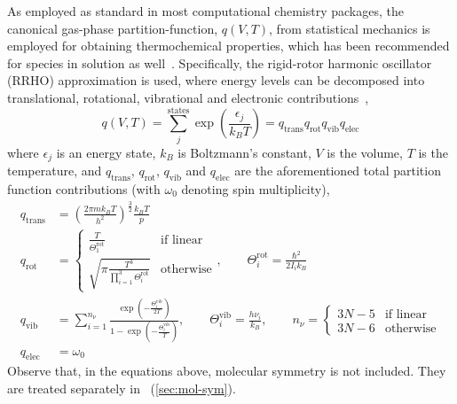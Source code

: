 As employed as standard in most computational chemistry packages,
the canonical gas-phase partition-function,
$q(V,
	T)$,
from statistical mechanics is employed for obtaining thermochemical properties,
which has been recommended for species in solution as well~\cite{Ribeiro_2011}.
Specifically,
the rigid-rotor harmonic oscillator (RRHO) approximation is used,
where energy levels can be decomposed into translational,
rotational,
vibrational and electronic contributions~\cite{McQuarrie_1997},
% 
\begin{equation}
	q(V,
	T) = \sum_j^\text{states} \exp \left( \frac{\epsilon_j}{k_B T} \right)
	= q_\text{trans}
	q_\text{rot}
	q_\text{vib}
	q_\text{elec}
\end{equation}
% 
where $\epsilon_j$ is an energy state,
$k_B$ is Boltzmann's constant,
$V$ is the volume,
$T$ is the temperature,
and $q_\text{trans}$,
$q_\text{rot}$,
$q_\text{vib}$ and $q_\text{elec}$ are the aforementioned total partition function contributions (with $\omega_0$ denoting spin multiplicity),
% 
\begin{equation}
	\begin{split}
		q_\text{trans}
		&= \left(
		\frac{2 \pi m k_B T}{h^2}
		\right)^\frac{3}{2}
		\frac{k_B T}{p} \\
		q_\text{rot}
		&= \begin{cases}
			\frac{T}{\Theta^\text{rot}_1}
			 & \text{if linear} \\
			\sqrt{
				\pi
				\frac{T^3}{
					\prod_{i = 1}^{3} \Theta^\text{rot}_i
				}
			}
			 & \text{otherwise}
		\end{cases},
		\qquad
		\Theta^\text{rot}_i = \frac{\hbar^2}{2 I_i k_B} \\
		q_\text{vib}
		&= \sum_{i = 1}^{n_\nu}
		\frac{
			\exp\left(
			- \frac{\Theta^\text{vib}_i}{2 T}
			\right)
		}{
			1 - \exp\left(
			- \frac{\Theta^\text{vib}_i
			}{T}
			\right)
		},
		\qquad
		\Theta^\text{vib}_i = \frac{h \nu_i}{k_B},
		\qquad
		n_\nu = \begin{cases}
			3 N - 5 & \text{if linear} \\
			3 N - 6 & \text{otherwise}
		\end{cases}
		\\
		q_\text{elec}
		&= \omega_0
	\end{split}
\end{equation}
% 
Observe that,
in the equations above,
molecular symmetry is not included.
They are treated separately in \overreact~(\cref{sec:mol-sym}).


